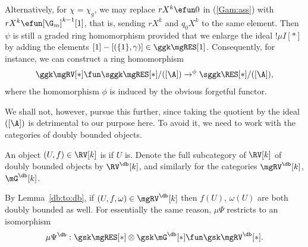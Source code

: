 \begin{rem}
Alternatively, for $\chi = \chi_{g}$, we may replace $r X^k \efun 0$ in (\ref{Gam:ass}) with $r X^k \efun [\G_m]^{k-1}[1]$, that is, sending $r X^k$ and $q_0 X^k$ to the same element.  Then $\psi$ is still a graded ring homomorphism provided that we enlarge the ideal $!\mu I[*]$ by adding the elements $[1] - [(\{1\}, \gamma)] \in \ggk \mgRES[1]$. Consequently, for instance, we can construct a ring homomorphism
\begin{equation}\label{res:forget}
\ggk \mgRV[*] \fun \sggk \mgRES[*] / ([\A]) \to^{\phi} \sggk \RES[*] / ([\A]),
\end{equation}
where the homomorphism $\phi$ is induced by the obvious forgetful functor.


We shall not, however, pursue this further, since taking the quotient by the ideal $([\A])$ is detrimental to our purpose here. To avoid it, we need to work with the categories of doubly bounded objects.
\end{rem}

\begin{defn}\label{db:RV}
An object $(U, f) \in \RV[k]$ is  if $U$ is. Denote the full subcategory of $\RV[k]$ of doubly bounded objects by $\RV^{\db}[k]$, and similarly for the categories $\mgRV^{\db}[k]$, $\mG^{\db}[k]$.
\end{defn}




\begin{rem}\label{tensor:bd}
By Lemma~\ref{db:to:db}, if $(U, f, \omega) \in \mgRV^{\db}[k]$ then $f(U)$, $\omega(U)$ are both doubly bounded as well. For essentially the same reason, ${\mu} \Psi$ restricts to an isomorphism
\[
{\mu} \Psi^{\db}: \gsk \mgRES[*] \otimes \gsk \mG^{\db}[*] \fun \gsk \mgRV^{\db}[*].
\]
\end{rem}

